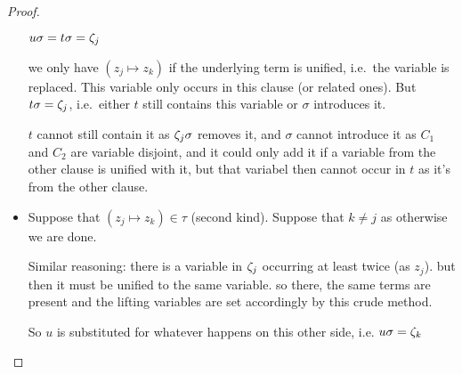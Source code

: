 \documentclass[,%
	paper=a4,%
	DIV14, 
	liststotoc,
	bibtotoc,
	draft=false,%
	numbers=noendperiod
]{scrartcl}
\begin{document}
\begin{proof}
\begin{itemize}
				\mytodo{}

				$u\sigma = t\sigma = \zeta_{j}$

				we only have $(z_j \mapsto z_k)$ if the underlying term is unified, i.e.\ the variable is replaced.
				This variable only occurs in this clause (or related ones).
				But $t\sigma=\zeta_{j}$, i.e.~either $t$ still contains this variable or $\sigma$ introduces it.

				$t$ cannot still contain it as $\zeta_{j}\sigma$ removes it, and $\sigma$ cannot introduce it as $C_1$ and $C_2$ are variable disjoint, and it could only add it if a variable from the other clause is unified with it, but that variabel then cannot occur in $t$ as it's from the other clause.


			\item
				Suppose that $(z_j\mapsto z_k) \in \tau$ (second kind). Suppose that $k\neq j$ as otherwise we are done.

				Similar reasoning: there is a variable in $\zeta_{j}$ occurring at least twice (as $z_j$).
				but then it must be unified to the same variable. so there, the same terms are present and the lifting variables are set accordingly by this crude method.

				So $u$ is substituted for whatever happens on this other side, i.e. $u\sigma = \zeta_{k}$
	\end{itemize}
\end{proof}
\cbend
\end{document}
